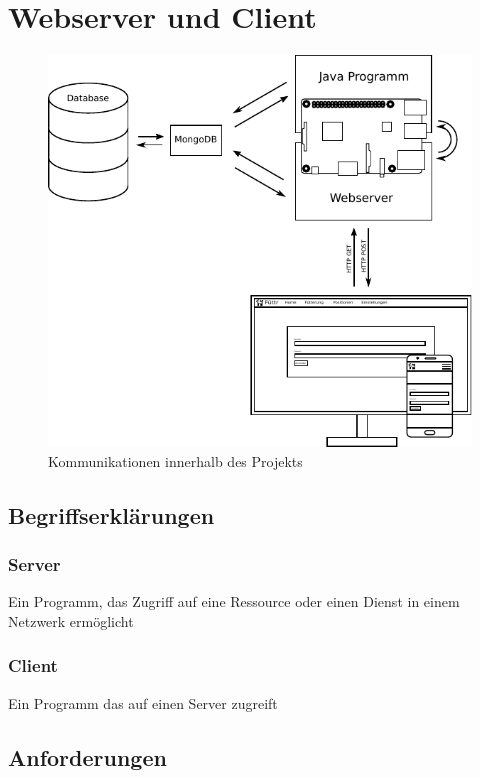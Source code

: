 \chapter{Webserver und Client}

\begin{figure}[H]
	\includegraphics[width=1\textwidth]{Bilder/SVGS/Communication}
	\caption{Kommunikationen innerhalb des Projekts}
	\label{kommunikation}
\end{figure}

\section{Begriffserklärungen}
\label{sec:begriffserklaerung}

\subsection{Server}
\label{sec:begrr-server}
Ein Programm, das Zugriff auf eine Ressource oder einen Dienst in einem Netzwerk ermöglicht

\subsection{Client}
\label{sec:begrr-client}
Ein Programm das auf einen Server zugreift

\section{Anforderungen}
\label{sec:anforderungen}

